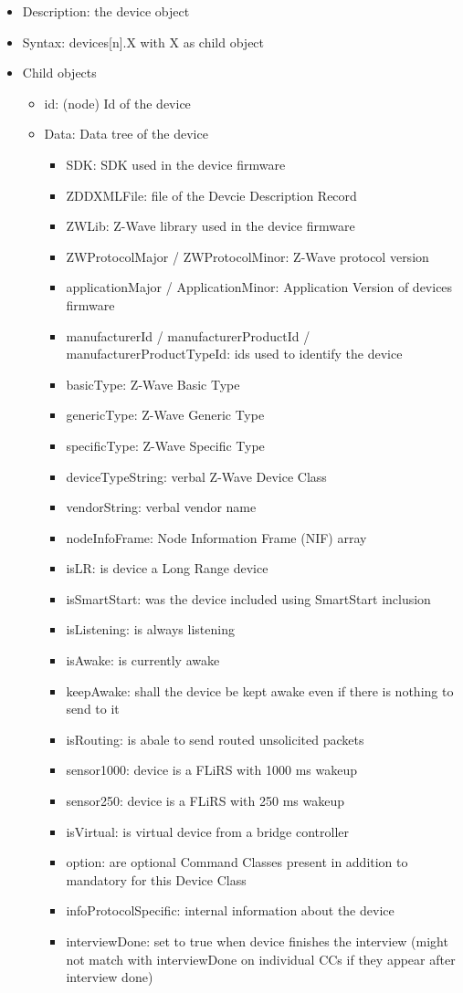\begin {itemize}
\item Description: the device object
\item Syntax:  devices[n].X with X as child object
\item Child objects
\begin {itemize}
\item id: (node) Id of the device
\item Data: Data tree of the device
\begin {itemize}
\item SDK: SDK used in the device firmware
\item ZDDXMLFile: file of the Devcie Description Record
\item ZWLib: Z-Wave library used in the device firmware
\item ZWProtocolMajor / ZWProtocolMinor: Z-Wave protocol version
\item applicationMajor / ApplicationMinor: Application Version of devices firmware
\item manufacturerId / manufacturerProductId / manufacturerProductTypeId: ids used to identify the device
\item basicType: Z-Wave Basic Type
\item genericType: Z-Wave Generic Type
\item specificType: Z-Wave Specific Type
\item deviceTypeString: verbal Z-Wave Device Class
\item vendorString: verbal vendor name

\item nodeInfoFrame: Node Information Frame (NIF) array
\item isLR: is device a Long Range device
\item isSmartStart: was the device included using SmartStart inclusion
\item isListening: is always listening
\item isAwake: is currently awake
\item keepAwake: shall the device be kept awake even if there is nothing to send to it
\item isRouting: is abale to send routed unsolicited packets
\item sensor1000: device is a FLiRS with 1000 ms wakeup
\item sensor250: device is a FLiRS with 250 ms wakeup
\item isVirtual: is virtual device from a bridge controller
\item option: are optional Command Classes present in addition to mandatory for this Device Class
\item infoProtocolSpecific: internal information about the device
\item interviewDone: set to true when device finishes the interview (might not match with interviewDone on individual CCs if they appear after interview done)


\end{itemize}
\end{itemize}
\end{itemize}
